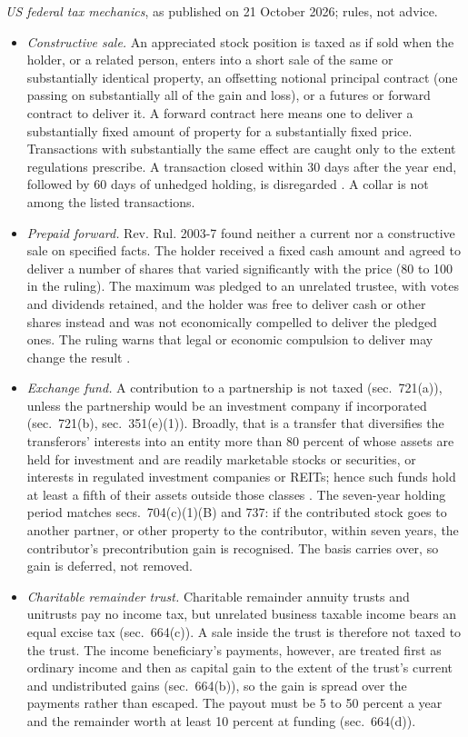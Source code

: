 \begin{qfmethod}
\emph{US federal tax mechanics}, as published on 21 October 2026; rules, not advice.
\begin{itemize}
\item \emph{Constructive sale.} An appreciated stock position is taxed as if sold when the holder, or a related person, enters into a short sale of the same or substantially identical property, an offsetting notional principal contract (one passing on substantially all of the gain and loss), or a futures or forward contract to deliver it. A forward contract here means one to deliver a substantially fixed amount of property for a substantially fixed price. Transactions with substantially the same effect are caught only to the extent regulations prescribe. A transaction closed within 30 days after the year end, followed by 60 days of unhedged holding, is disregarded \citep[sec.~1259(a), (c)(1), (c)(3), (d)]{us-internal-revenue-code-26}. A collar is not among the listed transactions.
\item \emph{Prepaid forward.} Rev. Rul. 2003-7 found neither a current nor a constructive sale on specified facts. The holder received a fixed cash amount and agreed to deliver a number of shares that varied significantly with the price (80 to 100 in the ruling). The maximum was pledged to an unrelated trustee, with votes and dividends retained, and the holder was free to deliver cash or other shares instead and was not economically compelled to deliver the pledged ones. The ruling warns that legal or economic compulsion to deliver may change the result \citep[2003-5 I.R.B., pp.~363--365]{irs-rev-rul-2003-7}.
\item \emph{Exchange fund.} A contribution to a partnership is not taxed (sec.~721(a)), unless the partnership would be an investment company if incorporated (sec.~721(b), sec.~351(e)(1)). Broadly, that is a transfer that diversifies the transferors' interests into an entity more than 80 percent of whose assets are held for investment and are readily marketable stocks or securities, or interests in regulated investment companies or REITs; hence such funds hold at least a fifth of their assets outside those classes \citep[para.~(c)(1), (c)(5)]{us-treas-reg-1-351-1}. The seven-year holding period matches secs.~704(c)(1)(B) and 737: if the contributed stock goes to another partner, or other property to the contributor, within seven years, the contributor's precontribution gain is recognised. The basis carries over, so gain is deferred, not removed.
\item \emph{Charitable remainder trust.} Charitable remainder annuity trusts and unitrusts pay no income tax, but unrelated business taxable income bears an equal excise tax (sec.~664(c)). A sale inside the trust is therefore not taxed to the trust. The income beneficiary's payments, however, are treated first as ordinary income and then as capital gain to the extent of the trust's current and undistributed gains (sec.~664(b)), so the gain is spread over the payments rather than escaped. The payout must be 5 to 50 percent a year and the remainder worth at least 10 percent at funding (sec.~664(d)).
\end{itemize}


\end{qfmethod}
